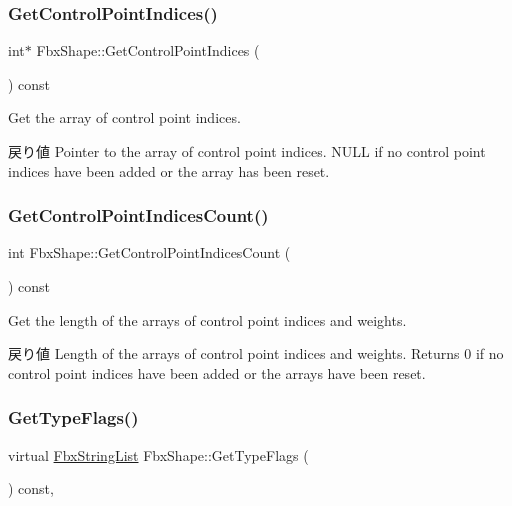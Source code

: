 \subsubsection{\texorpdfstring{Get\+Control\+Point\+Indices()}{GetControlPointIndices()}}
{\footnotesize\ttfamily int$\ast$ Fbx\+Shape\+::\+Get\+Control\+Point\+Indices (\begin{DoxyParamCaption}{ }\end{DoxyParamCaption}) const}

Get the array of control point indices. \begin{DoxyReturn}{戻り値}
Pointer to the array of control point indices. {\ttfamily N\+U\+LL} if no control point indices have been added or the array has been reset. 
\end{DoxyReturn}
\mbox{\label{class_fbx_shape_afd2216f7ace9be5b39f2d5d6dcc8447f}} 
\subsubsection{\texorpdfstring{Get\+Control\+Point\+Indices\+Count()}{GetControlPointIndicesCount()}}
{\footnotesize\ttfamily int Fbx\+Shape\+::\+Get\+Control\+Point\+Indices\+Count (\begin{DoxyParamCaption}{ }\end{DoxyParamCaption}) const}

Get the length of the arrays of control point indices and weights. \begin{DoxyReturn}{戻り値}
Length of the arrays of control point indices and weights. Returns 0 if no control point indices have been added or the arrays have been reset. 
\end{DoxyReturn}
\mbox{\label{class_fbx_shape_a36129584616ab648435077244d6e6dbf}} 
\subsubsection{\texorpdfstring{Get\+Type\+Flags()}{GetTypeFlags()}}
{\footnotesize\ttfamily virtual \hyperlink{class_fbx_string_list}{Fbx\+String\+List} Fbx\+Shape\+::\+Get\+Type\+Flags (\begin{DoxyParamCaption}{ }\end{DoxyParamCaption}) const\hspace{0.3cm}{\ttfamily [protected]}, {\ttfamily [virtual]}}



